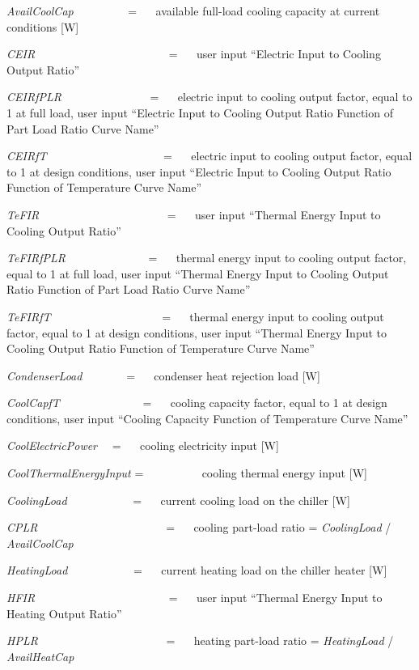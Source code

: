 \emph{AvailCoolCap}~~~~~~~~~ = ~~ available full-load cooling capacity at current conditions {[}W{]}

\emph{CEIR}~~~~~~~~~~~~~~~~~~~~~~~ = ~~ user input ``Electric Input to Cooling Output Ratio''

\emph{CEIRfPLR}~~~~~~~~~~~~~~~ = ~~ electric input to cooling output factor, equal to 1 at full load, user input ``Electric Input to Cooling Output Ratio Function of Part Load Ratio Curve Name''

\emph{CEIRfT}~~~~~~~~~~~~~~~~~~~~ = ~~ electric input to cooling output factor, equal to 1 at design conditions, user input ``Electric Input to Cooling Output Ratio Function of Temperature Curve Name''

\emph{TeFIR}~~~~~~~~~~~~~~~~~~~~~~ = ~~ user input ``Thermal Energy Input to Cooling Output Ratio''

\emph{TeFIRfPLR}~~~~~~~~~~~~~~ = ~~ thermal energy input to cooling output factor, equal to 1 at full load, user input ``Thermal Energy Input to Cooling Output Ratio Function of Part Load Ratio Curve Name''

\emph{TeFIRfT}~~~~~~~~~~~~~~~~~~~ = ~~ thermal energy input to cooling output factor, equal to 1 at design conditions, user input ``Thermal Energy Input to Cooling Output Ratio Function of Temperature Curve Name''

\emph{CondenserLoad~~~~~~~} = ~~ condenser heat rejection load {[}W{]}

\emph{CoolCapfT}~~~~~~~~~~~~~~ = ~~ cooling capacity factor, equal to 1 at design conditions, user input ``Cooling Capacity Function of Temperature Curve Name''

\emph{CoolElectricPower}~~ = ~~ cooling electricity input {[}W{]}

\emph{CoolThermalEnergyInput} = ~~~~~~~~~ cooling thermal energy input {[}W{]}

\emph{CoolingLoad}~~~~~~~~~~~ = ~~ current cooling load on the chiller {[}W{]}

\emph{CPLR}~~~~~~~~~~~~~~~~~~~~~~ = ~~ cooling part-load ratio = \emph{CoolingLoad} / \emph{AvailCoolCap}

\emph{HeatingLoad}~~~~~~~~~~~ = ~~ current heating load on the chiller heater {[}W{]}

\emph{HFIR}~~~~~~~~~~~~~~~~~~~~~~~ = ~~ user input ``Thermal Energy Input to Heating Output Ratio''

\emph{HPLR}~~~~~~~~~~~~~~~~~~~~~~ = ~~ heating part-load ratio = \emph{HeatingLoad} / \emph{AvailHeatCap}

